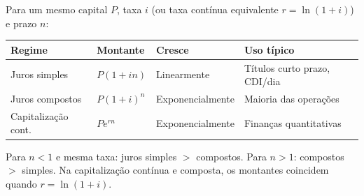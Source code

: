 Para um mesmo capital $P$, taxa $i$ (ou taxa contínua equivalente $r = \ln(1+i)$) e prazo $n$:
\begin{center}
\renewcommand{\arraystretch}{1.4}
\begin{tabular}{llll}
\toprule
\textbf{Regime}     & \textbf{Montante}    & \textbf{Cresce} & \textbf{Uso típico} \\
\midrule
Juros simples       & $P(1+in)$            & Linearmente     & Títulos curto prazo, CDI/dia \\
Juros compostos     & $P(1+i)^n$           & Exponencialmente & Maioria das operações \\
Capitalização cont. & $Pe^{rn}$            & Exponencialmente & Finanças quantitativas \\
\bottomrule
\end{tabular}
\end{center}

\begin{nota}
Para $n < 1$ e mesma taxa: juros simples $>$ compostos. Para $n > 1$: compostos $>$ simples. Na capitalização contínua e composta, os montantes coincidem quando $r = \ln(1+i)$.
\end{nota}
